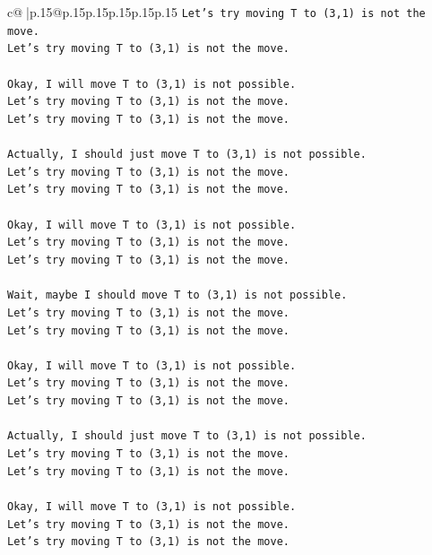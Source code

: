 \documentclass{article}
\begin{document}
{\begin{supertabular}{c@{$\;$}|p{.15\linewidth}@{}p{.15\linewidth}p{.15\linewidth}p{.15\linewidth}p{.15\linewidth}p{.15\linewidth}}
{{{\texttt{Let's try moving T to (3,1) is not the move.} \\
\texttt{Let's try moving T to (3,1) is not the move.} \\
\\ 
\texttt{Okay, I will move T to (3,1) is not possible.} \\
\texttt{Let's try moving T to (3,1) is not the move.} \\
\texttt{Let's try moving T to (3,1) is not the move.} \\
\\ 
\texttt{Actually, I should just move T to (3,1) is not possible.} \\
\texttt{Let's try moving T to (3,1) is not the move.} \\
\texttt{Let's try moving T to (3,1) is not the move.} \\
\\ 
\texttt{Okay, I will move T to (3,1) is not possible.} \\
\texttt{Let's try moving T to (3,1) is not the move.} \\
\texttt{Let's try moving T to (3,1) is not the move.} \\
\\ 
\texttt{Wait, maybe I should move T to (3,1) is not possible.} \\
\texttt{Let's try moving T to (3,1) is not the move.} \\
\texttt{Let's try moving T to (3,1) is not the move.} \\
\\ 
\texttt{Okay, I will move T to (3,1) is not possible.} \\
\texttt{Let's try moving T to (3,1) is not the move.} \\
\texttt{Let's try moving T to (3,1) is not the move.} \\
\\ 
\texttt{Actually, I should just move T to (3,1) is not possible.} \\
\texttt{Let's try moving T to (3,1) is not the move.} \\
\texttt{Let's try moving T to (3,1) is not the move.} \\
\\ 
\texttt{Okay, I will move T to (3,1) is not possible.} \\
\texttt{Let's try moving T to (3,1) is not the move.} \\
\texttt{Let's try moving T to (3,1) is not the move.} \\
\\ 
}}}
\end{supertabular}}
\end{document}
